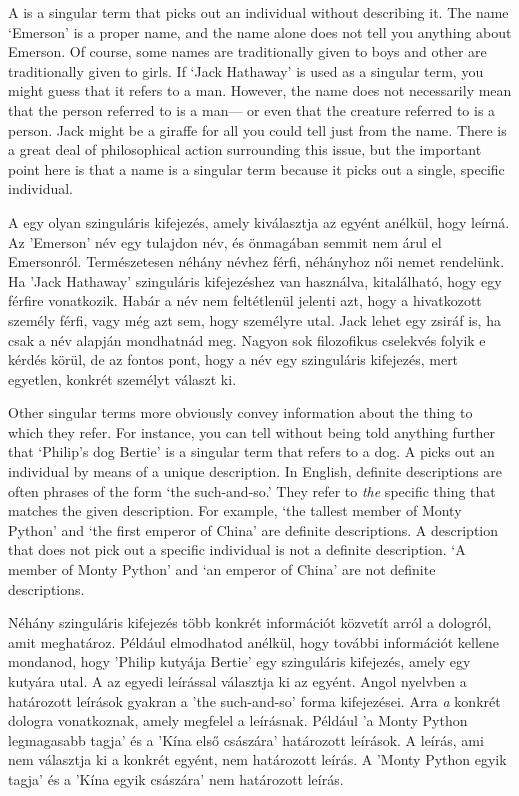 

A  is a singular term that picks out an individual without describing it. The name `Emerson' is a proper name, and the name alone does not tell you anything about Emerson. Of course, some names are traditionally given to boys and other are traditionally given to girls. If `Jack Hathaway' is used as a singular term, you might guess that it refers to a man. However, the name does not necessarily mean that the person referred to is a man--- or even that the creature referred to is a person. Jack might be a giraffe for all you could tell just from the name. There is a great deal of philosophical action surrounding this issue, but the important point here is that a name is a singular term because it picks out a single, specific individual.

A  egy olyan szinguláris kifejezés, amely kiválasztja az egyént anélkül, hogy leírná. Az ’Emerson’ név egy tulajdon név, és önmagában semmit nem árul el Emersonról. Természetesen néhány névhez férfi, néhányhoz női nemet rendelünk. Ha ’Jack Hathaway’ szinguláris kifejezéshez van használva, kitalálható, hogy egy férfire vonatkozik. Habár a név nem feltétlenül jelenti azt, hogy a hivatkozott személy férfi, vagy még azt sem, hogy személyre utal. Jack lehet egy zsiráf is, ha csak a név alapján mondhatnád meg. Nagyon sok filozofikus cselekvés folyik e kérdés körül, de az fontos pont, hogy a név egy szinguláris kifejezés, mert egyetlen, konkrét személyt választ ki. 

Other singular terms more obviously convey information about the thing to which they refer. For instance, you can tell without being told anything further that `Philip's dog Bertie' is a singular term that refers to a dog. A  picks out an individual by means of a unique description. In English, definite descriptions are often phrases of the form `the such-and-so.' They refer to \emph{the} specific thing that matches the given description. For example, `the tallest member of Monty Python' and `the first emperor of China' are definite descriptions. A description that does not pick out a specific individual is not a definite description. `A member of Monty Python' and `an emperor of China' are not definite descriptions.

Néhány szinguláris kifejezés több konkrét információt közvetít arról a dologról, amit meghatároz. Például elmodhatod anélkül, hogy további információt kellene mondanod, hogy ’Philip kutyája Bertie’ egy szinguláris kifejezés, amely egy kutyára utal. A  az egyedi leírással választja ki az egyént. Angol nyelvben a határozott leírások gyakran a ’the such-and-so’ forma kifejezései. Arra \emph{a} konkrét dologra vonatkoznak, amely megfelel a leírásnak. Például ’a Monty Python legmagasabb tagja’ és a ’Kína első császára’ határozott leírások. A leírás, ami nem választja ki a konkrét egyént, nem határozott leírás. A ’Monty Python egyik tagja’ és a  ’Kína egyik császára’ nem határozott leírás.

